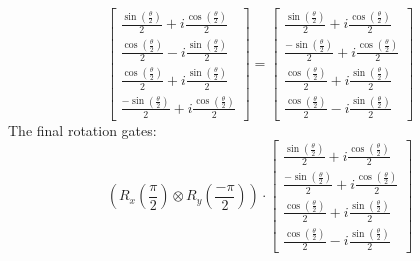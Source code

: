 \documentclass{article}
\begin{document}
\begin{itemize}
\[\begin{bmatrix}
			      \frac{\sin \left(\frac{\theta}{2}\right)}{2} + i \frac{\cos \left(\frac{\theta}{2}\right)}{2} \\
			      \frac{\cos \left(\frac{\theta}{2}\right)}{2} - i \frac{\sin \left(\frac{\theta}{2}\right)}{2} \\
			      \frac{\cos \left(\frac{\theta}{2}\right)}{2} + i \frac{\sin \left(\frac{\theta}{2}\right)}{2} \\
			      \frac{-\sin \left(\frac{\theta}{2}\right)}{2} + i \frac{\cos \left(\frac{\theta}{2}\right)}{2}
		      \end{bmatrix}
		      =
		      \begin{bmatrix}
			      \frac{\sin \left(\frac{\theta}{2}\right)}{2} + i \frac{\cos \left(\frac{\theta}{2}\right)}{2}  \\
			      \frac{-\sin \left(\frac{\theta}{2}\right)}{2} + i \frac{\cos \left(\frac{\theta}{2}\right)}{2} \\
			      \frac{\cos \left(\frac{\theta}{2}\right)}{2} + i \frac{\sin \left(\frac{\theta}{2}\right)}{2}  \\
			      \frac{\cos \left(\frac{\theta}{2}\right)}{2} - i \frac{\sin \left(\frac{\theta}{2}\right)}{2}
		      \end{bmatrix}
	      \]
	      The final rotation gates:
	      \[\left(R_x(\frac{\pi}{2}) \otimes R_y(\frac{-\pi}{2})\right) \cdot
		      \begin{bmatrix}
			      \frac{\sin \left(\frac{\theta}{2}\right)}{2} + i \frac{\cos \left(\frac{\theta}{2}\right)}{2}  \\
			      \frac{-\sin \left(\frac{\theta}{2}\right)}{2} + i \frac{\cos \left(\frac{\theta}{2}\right)}{2} \\
			      \frac{\cos \left(\frac{\theta}{2}\right)}{2} + i \frac{\sin \left(\frac{\theta}{2}\right)}{2}  \\
			      \frac{\cos \left(\frac{\theta}{2}\right)}{2} - i \frac{\sin \left(\frac{\theta}{2}\right)}{2}
		      \end{bmatrix}
	      \]


\end{itemize}
\end{document}
